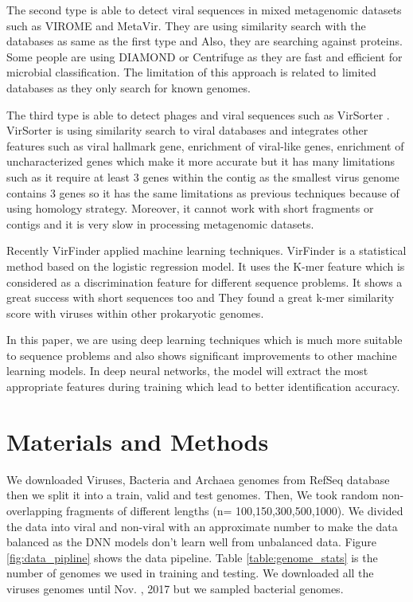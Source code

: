 \documentclass[conference]{IEEEtran}
\begin{document}
The second type is able to detect viral sequences in mixed metagenomic datasets such as VIROME \cite{wommack2012virome} and MetaVir\cite{roux2011metavir}. They are using similarity search with the databases as same as the first type and Also, they are searching against proteins. Some people are using DIAMOND \cite{buchfink2014Diamond} or Centrifuge \cite{kim2016centrifuge} as they are fast and efficient for microbial classification. The limitation of this approach is related to limited databases as they only search for known genomes. 

The third type is able to detect phages and viral sequences such as VirSorter \cite{roux2015virsorter}. VirSorter is using similarity search to viral databases and integrates other features such as viral hallmark gene, enrichment of viral-like genes, enrichment of uncharacterized genes which make it more accurate but it has many limitations such as it require at least 3 genes within the contig as the smallest virus genome contains 3 genes so it has the same limitations as previous techniques because of using homology strategy. Moreover, it cannot work with short fragments or contigs and it is very slow in processing metagenomic datasets. 

Recently VirFinder \cite{ren2017virfinder} applied machine learning techniques. VirFinder is a statistical method based on the logistic regression model. It uses the K-mer feature which is considered as a discrimination feature for different sequence problems. It shows a great success with short sequences too and They found a great k-mer similarity score with viruses within other prokaryotic genomes. 


In this paper, we are using deep learning techniques which is much more suitable to sequence problems and also shows significant improvements to other machine learning models. In deep neural networks, the model will extract the most appropriate features during training which lead to better identification accuracy. 

\section{Materials and Methods}

We downloaded Viruses, Bacteria and Archaea genomes from RefSeq database then we split it into a train, valid and test genomes. Then, We took random non-overlapping fragments of different lengths (n= 100,150,300,500,1000). We divided the data into viral and non-viral with an approximate number to make the data balanced as the DNN models don't learn well from unbalanced data. Figure \ref{fig:data_pipline} shows the data pipeline. Table \ref{table:genome_stats} is the number of genomes we used in training and testing. We downloaded all the viruses genomes until Nov. , 2017 but we sampled bacterial genomes.
\end{document}
